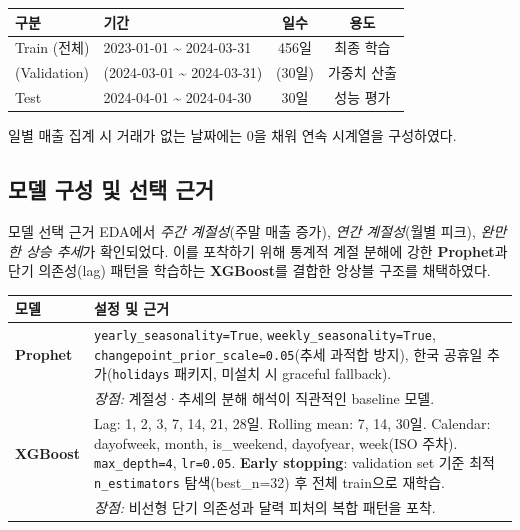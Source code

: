 \documentclass[a4paper, 11pt]{article}
\begin{document}
\begin{center}
\begin{tabular}{llcc}
\toprule
\textbf{구분} & \textbf{기간} & \textbf{일수} & \textbf{용도} \\
\midrule
Train (전체) & 2023-01-01 \textasciitilde{} 2024-03-31 & 456일 & 최종 학습 \\
\quad (Validation) & (2024-03-01 \textasciitilde{} 2024-03-31) & (30일) & 가중치 산출 \\
Test & 2024-04-01 \textasciitilde{} 2024-04-30 & 30일 & 성능 평가 \\
\bottomrule
\end{tabular}
\end{center}

일별 매출 집계 시 거래가 없는 날짜에는 0을 채워 연속 시계열을 구성하였다.

\subsection{모델 구성 및 선택 근거}

\begin{infobox}{모델 선택 근거}
EDA에서 \textit{주간 계절성}(주말 매출 증가), \textit{연간 계절성}(월별 피크), \textit{완만한 상승 추세}가
확인되었다. 이를 포착하기 위해 통계적 계절 분해에 강한 \textbf{Prophet}과
단기 의존성(lag) 패턴을 학습하는 \textbf{XGBoost}를 결합한 앙상블 구조를 채택하였다.
\end{infobox}

\begin{center}
\small
\renewcommand{\arraystretch}{1.3}
\begin{tabular}{lp{9.5cm}}
\toprule
\textbf{모델} & \textbf{설정 및 근거} \\
\midrule
\textbf{Prophet} &
  \texttt{yearly\_seasonality=True}, \texttt{weekly\_seasonality=True},
  \texttt{changepoint\_prior\_scale=0.05}(추세 과적합 방지),
  한국 공휴일 추가(\texttt{holidays} 패키지, 미설치 시 graceful fallback). \\
  & \textit{장점:} 계절성·추세의 분해 해석이 직관적인 baseline 모델. \\
\midrule
\textbf{XGBoost} &
  Lag: 1, 2, 3, 7, 14, 21, 28일.
  Rolling mean: 7, 14, 30일.
  Calendar: dayofweek, month, is\_weekend, dayofyear, week(ISO 주차).
  \texttt{max\_depth=4}, \texttt{lr=0.05}.
  \textbf{Early stopping}: validation set 기준 최적 \texttt{n\_estimators} 탐색(best\_n=32) 후 전체 train으로 재학습. \\
  & \textit{장점:} 비선형 단기 의존성과 달력 피처의 복합 패턴을 포착. \\
\bottomrule
\end{tabular}
\end{center}
\end{document}
